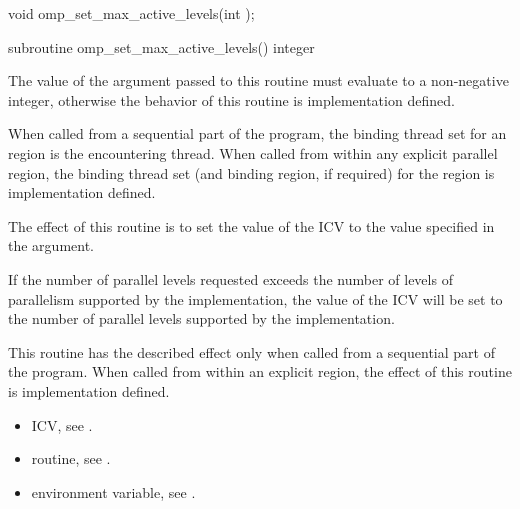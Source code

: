 \format
\begin{ccppspecific}
\begin{boxedcode}
void omp\_set\_max\_active\_levels(int );
\end{boxedcode}
\end{ccppspecific}

\begin{fortranspecific}
\begin{boxedcode}
subroutine omp\_set\_max\_active\_levels()
integer 
\end{boxedcode}
\end{fortranspecific}

\constraints
The value of the argument passed to this routine must evaluate to a non-negative integer, 
otherwise the behavior of this routine is implementation defined.

\binding
When called from a sequential part of the program, the binding thread set for an 
 region is the encountering thread. When called 
from within any explicit parallel region, the binding thread set (and binding region, if 
required) for the  region is implementation defined. 

\effect
The effect of this routine is to set the value of the  ICV to the value 
specified in the argument. 

If the number of parallel levels requested exceeds the number of levels of parallelism 
supported by the implementation, the value of the  ICV will be set 
to the number of parallel levels supported by the implementation.

This routine has the described effect only when called from a sequential part of the 
program. When called from within an explicit  region, the effect of this 
routine is implementation defined.

\crossreferences
\begin{itemize}
\item {} ICV, see 
.

\item {} routine, see 
.

\item {} environment variable, see 
.
\end{itemize}










